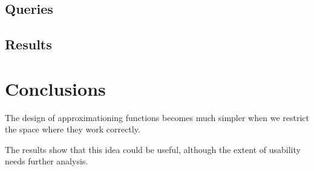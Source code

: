 \documentclass [12pt]{article} %
\begin{document}
\subsection{Queries}

\subsection{Results}

\section{Conclusions}

The design of approximationing functions becomes much simpler when we restrict the
space where they work correctly.

The results show that this idea could be useful, although the extent of usability
needs further analysis.

\nocite{*}


\end{document}
